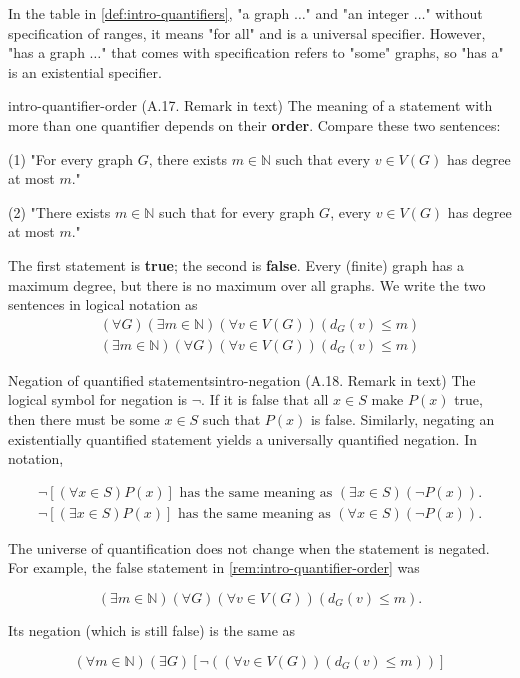 \documentclass[../src/handouts/main.tex]{subfiles}
\begin{document}
In the table in \cref{def:intro-quantifiers}, "a graph $\ldots$" and "an integer $\ldots$" without specification of ranges, it means "for all" and is a universal specifier. However, "has a graph $\ldots$" that comes with specification refers to "some" graphs, so "has a" is an existential specifier.

\begin{remark}{}{intro-quantifier-order}
  (A.17. Remark in text)
  The meaning of a statement with more than one quantifier depends on their \textbf{order}. Compare these two sentences:

  (1) "For every graph $G$, there exists $m \in \mathbb{N}$ such that every $v \in V(G)$ has degree at most $m$."

  (2) "There exists $m \in \mathbb{N}$ such that for every graph $G$, every $v \in V(G)$ has degree at most $m$."

  The first statement is \textbf{true}; the second is \textbf{false}.
  Every (finite) graph has a maximum degree, but there is no maximum over all graphs.
  We write the two sentences in logical notation as
  $$
    \begin{aligned}
      (\forall G)(\exists m \in \mathbb{N})(\forall v \in V(G))\left(d_G(v) \leq m\right) \\
      (\exists m \in \mathbb{N})(\forall G)(\forall v \in V(G))\left(d_G(v) \leq m\right)
    \end{aligned}
  $$
\end{remark}

\begin{remark}{Negation of quantified statements}{intro-negation}
  (A.18. Remark in text)
  The logical symbol for negation is $\neg$. If it is false that all $x \in S$ make $P(x)$ true, then there must be some $x \in S$ such that $P(x)$ is false. Similarly, negating an existentially quantified statement yields a universally quantified negation. In notation,

  $$
    \begin{aligned}
      \neg[(\forall x \in S) P(x)] \text{ has the same meaning as } (\exists x \in S)(\neg P(x)). \\
      \neg[(\exists x \in S) P(x)] \text{ has the same meaning as } (\forall x \in S)(\neg P(x)).
    \end{aligned}
  $$

  The universe of quantification does not change when the statement is negated.
  For example, the false statement in \cref{rem:intro-quantifier-order} was

  $$
    (\exists m \in \mathbb{N})(\forall G)(\forall v \in V(G))\left(d_G(v) \leq m\right) .
  $$

  Its negation (which is still false) is the same as

  $$
    (\forall m \in \mathbb{N})(\exists G)\left[\neg\left((\forall v \in V(G))\left(d_G(v) \leq m\right)\right)\right]
  $$
\end{remark}
\end{document}
